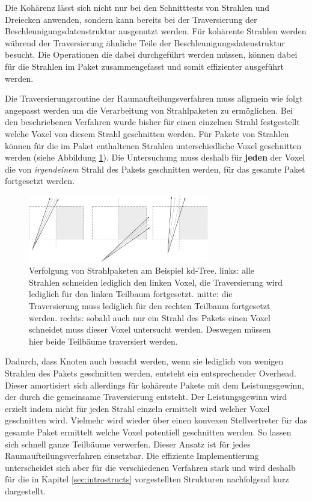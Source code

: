 Die Kohärenz lässt sich nicht nur bei den Schnitttests von Strahlen und Dreiecken anwenden, sondern kann bereits bei der Traversierung der Beschleunigungsdatenstruktur ausgenutzt werden. Für kohärente Strahlen werden während der Traversierung ähnliche Teile der Beschleunigungsdatenstruktur besucht. Die Operationen die dabei durchgeführt werden müssen, können dabei für die Strahlen im Paket zusammengefasst und somit effizienter ausgeführt werden.

Die Traversierungsroutine der Raumaufteilungsverfahren muss allgmein wie folgt angepasst werden  um die Verarbeitung von Strahlpaketen zu ermöglichen. Bei den beschriebenen Verfahren wurde bisher für einen einzelnen Strahl festgestellt welche Voxel von diesem Strahl geschnitten werden. Für Pakete von Strahlen können für die im Paket enthaltenen Strahlen unterschiedliche Voxel geschnitten werden (siehe Abbildung \ref{fig:packettraversal}). Die Untersuchung muss deshalb für \textbf{jeden} der Voxel die von \textit{irgendeinem} Strahl des Pakets geschnitten werden, für das gesamte Paket fortgesetzt werden.

\begin{figure}\centering
\includegraphics[width=0.7\textwidth]{images/packettraversal.pdf} 
\caption[Verfolgung von Strahlpaketen am Beispiel kd-Tree]{Verfolgung von Strahlpaketen am Beispiel kd-Tree. links: alle Strahlen schneiden lediglich den linken Voxel, die Traversierung wird lediglich für den linken Teilbaum fortgesetzt. mitte: die Traversierung muss lediglich für den rechten Teilbaum fortgesetzt werden. rechts: sobald auch nur ein Strahl des Pakets einen Voxel schneidet muss dieser Voxel untersucht werden. Deswegen müssen hier beide Teilbäume traversiert werden.}
\label{fig:packettraversal}
\end{figure}

Dadurch, dass Knoten auch besucht werden, wenn sie lediglich von wenigen Strahlen des Pakets geschnitten werden, entsteht ein entsprechender Overhead. Dieser amortisiert sich allerdings für kohärente Pakete mit dem Leistungsgewinn, der durch die gemeinsame Traversierung entsteht. Der Leistungsgewinn wird erzielt indem nicht für jeden Strahl einzeln ermittelt wird welcher Voxel geschnitten wird. Vielmehr wird wieder über einen konvexen Stellvertreter für das gesamte Paket ermittelt welche Voxel potentiell geschnitten werden. So lassen sich schnell ganze Teilbäume verwerfen.
Dieser Ansatz ist für jedes Raumaufteilungsverfahren einsetzbar. Die effiziente Implementierung unterscheidet sich aber für die verschiedenen Verfahren stark und wird deshalb für die in Kapitel \ref{sec:introstructs} vorgestellten Strukturen nachfolgend kurz dargestellt.



